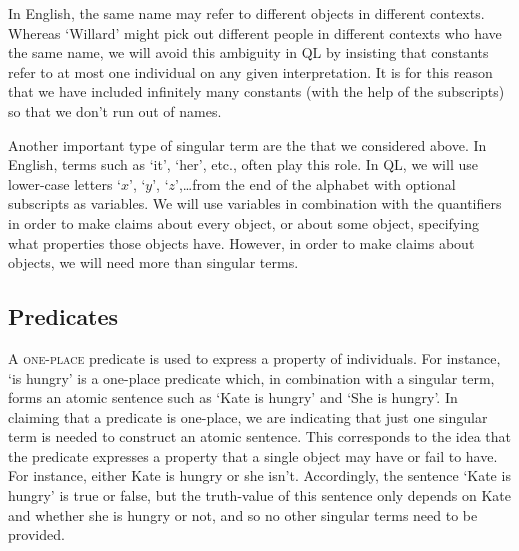 In English, the same name may refer to different objects in different contexts.
Whereas `Willard' might pick out different people in different contexts who have the same name, we will avoid this ambiguity in QL by insisting that constants refer to at most one individual on any given interpretation.
It is for this reason that we have included infinitely many constants (with the help of the subscripts) so that we don't run out of names.


Another important type of singular term are the  that we considered above.
In English, terms such as `it', `her', etc., often play this role.
In QL, we will use lower-case letters `$x$', `$y$', `$z$',\ldots from the end of the alphabet with optional subscripts as variables.
We will use variables in combination with the quantifiers in order to make claims about every object, or about some object, specifying what properties those objects have.
However, in order to make claims about objects, we will need more than singular terms.





\subsection{Predicates}

A \textsc{one-place} predicate is used to express a property of individuals.
For instance, `is hungry' is a one-place predicate which, in combination with a singular term, forms an atomic sentence such as `Kate is hungry' and `She is hungry'.
In claiming that a predicate is one-place, we are indicating that just one singular term is needed to construct an atomic sentence.
This corresponds to the idea that the predicate expresses a property that a single object may have or fail to have.
For instance, either Kate is hungry or she isn't.
Accordingly, the sentence `Kate is hungry' is true or false, but the truth-value of this sentence only depends on Kate and whether she is hungry or not, and so no other singular terms need to be provided.

